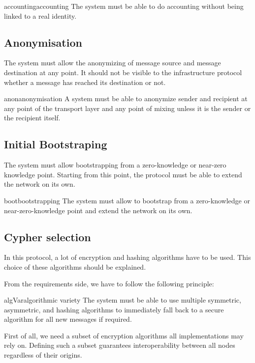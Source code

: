 \begin{requirement}{accounting}{accounting}
	The system must be able to do accounting without being linked to a real identity.
\end{requirement}

\subsection{Anonymisation}
The system must allow the anonymizing of message source and message destination at any point. It should not be visible to the infrastructure protocol whether a message has reached its destination or not. 

\begin{requirement}{anon}{anonymisation}
	A system must be able to anonymize sender and recipient at any point of the transport layer and any point of mixing unless it is the sender or the recipient itself.
\end{requirement}

\subsection{Initial Bootstraping}
The system must allow bootstrapping from a zero-knowledge or near-zero knowledge point. Starting from this point, the protocol must be able to extend the network on its own.

\begin{requirement}{boot}{bootstrapping}
	The system must allow to bootstrap from a zero-knowledge or near-zero-knowledge point and extend the network on its own. 
\end{requirement}

\subsection{Cypher selection}
In this protocol, a lot of encryption and hashing algorithms have to be used. This choice of these algorithms should be explained. 

From the requirements side, we have to follow the following principle:
\begin{requirement}{algVar}{algorithmic variety}
	The system must be able to use multiple symmetric, asymmetric, and hashing algorithms to immediately fall back to a secure algorithm for all new messages if required. 
\end{requirement}

First of all, we need a subset of encryption algorithms all implementations may rely on. Defining such a subset guarantees interoperability between all nodes regardless of their origins. 

